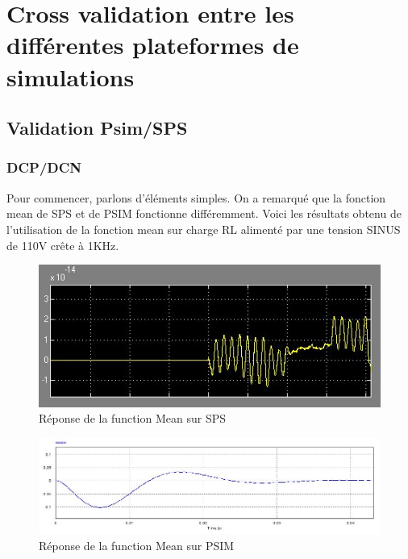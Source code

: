\documentclass[11pt,letterpaper,final]{report}
\begin{document}
\chapter{Cross validation entre les différentes plateformes de simulations}
\section{Validation Psim/SPS}
\subsection{DCP/DCN}
Pour commencer, parlons d'éléments simples. On a remarqué que la fonction mean de SPS et de PSIM fonctionne différemment. Voici les résultats obtenu de l'utilisation de la fonction mean sur charge RL alimenté par une tension SINUS de 110V crête à 1KHz.
\begin{figure}[h!]
\centering
\includegraphics[scale=0.8]{mean_SPS.jpg}
\caption{Réponse de la function Mean sur SPS}
\end{figure}
\begin{figure}[h!]
\centering
\includegraphics[scale=0.5]{mean_PSIM.jpg}
\caption{Réponse de la function Mean sur PSIM}
\end{figure}
\end{document}
